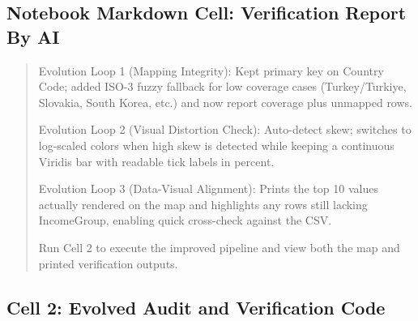 \documentclass[11pt]{article}
\begin{document}
\subsection*{Notebook Markdown Cell: Verification Report By AI}

\begin{quote}
Evolution Loop 1 (Mapping Integrity): Kept primary key on Country Code; added ISO-3 fuzzy fallback for low coverage cases (Turkey/Turkiye, Slovakia, South Korea, etc.) and now report coverage plus unmapped rows.

Evolution Loop 2 (Visual Distortion Check): Auto-detect skew; switches to log-scaled colors when high skew is detected while keeping a continuous Viridis bar with readable tick labels in percent.

Evolution Loop 3 (Data-Visual Alignment): Prints the top 10 values actually rendered on the map and highlights any rows still lacking IncomeGroup, enabling quick cross-check against the CSV.

Run Cell 2 to execute the improved pipeline and view both the map and printed verification outputs.
\end{quote}

\subsection*{Cell 2: Evolved Audit and Verification Code}
\end{document}
